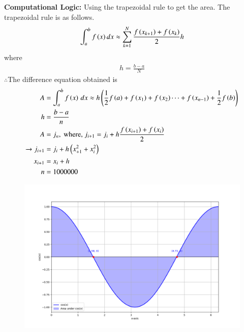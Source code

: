 \documentclass[journal]{IEEEtran}
\begin{document}
\textbf{Computational Logic:} 
Using the trapezoidal rule to get the area. The trapezoidal rule is as follows.
\begin{align}
    \int^{b}_{a} f\left(x\right)dx\approx \sum^{N}_{k=1}\frac{f\left(x_{k+1}\right)+f\left(x_{k}\right)}{2}h
\end{align}
where
\begin{align}
    h=\frac{b-a}{N}
\end{align}
$\therefore$The difference equation obtained is\\
\begin{align}
    A &= \int_a^b f\left(x\right)\, dx \approx h\left(\frac{1}{2}f\left(a\right) + f\left(x_1\right) + f\left(x_2\right) \cdots + f\left(x_{n-1}\right) + \frac{1}{2}f\left(b\right)\right)\\
    h &= \frac{b-a}{n}\\
    A &= j_n, \text{ where, } j_{i + 1} = j_i + h\frac{f\left(x_{i+1}\right) + f\left(x_i\right)}{2}\\ 
        \xrightarrow{} j_{i + 1} &= j_i + h\left({x_{+1}^2}+{x_{i}^2}\right)\\
    x_{i+1} &= x_i + h\\
    n&=1000000
\end{align}
\begin{figure}[h]
    \centering
    \includegraphics[width=\columnwidth]{fig/figs.png}
 \end{figure}
\end{document}
